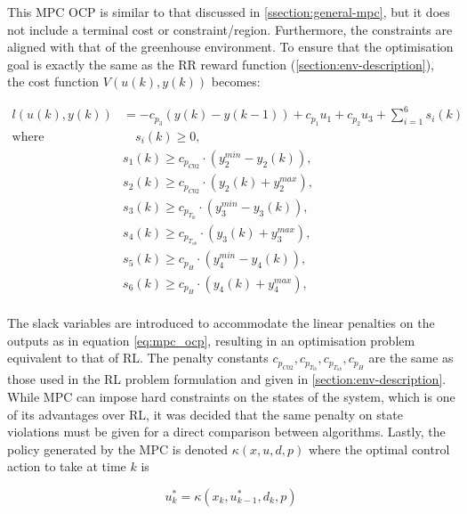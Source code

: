 This MPC OCP is similar to that discussed in \autoref{ssection:general-mpc}, but it does not include a terminal cost or constraint/region. Furthermore, the constraints are aligned with that of the greenhouse environment. To ensure that the optimisation goal is exactly the same as the RR reward function (\autoref{section:env-description}), the cost function $V(u(k),y(k))$ becomes:

\begin{equation} \label{eq:mpc_stage_cost}
	\begin{aligned}
		l(u(k),y(k)) & = - c_{p_3} (y(k) - y(k-1)) + c_{p_1} u_{1} + c_{p_2} u_{3} + \sum_{i = 1}^6 s_i(k) \\
		\text{where} & \quad s_i(k) \geq 0, \\
		& s_1(k) \geq c_{p_{C02}} \cdot (y_2^{min} - y_2(k)), \\ 
		& s_2(k) \geq c_{p_{C02}} \cdot (y_2(k) + y_2^{max}), \\ 
		& s_3(k) \geq c_{p_{T_{lb}}} \cdot (y_3^{min} - y_3(k)), \\ 
		& s_4(k) \geq c_{p_{T_{ub}}} \cdot (y_3(k) + y_3^{max}), \\ 
		& s_5(k) \geq c_{p_{H}} \cdot (y_4^{min} - y_4(k)), \\ 
		& s_6(k) \geq c_{p_{H}} \cdot (y_4(k) + y_4^{max}), \\
	\end{aligned}	
\end{equation}

The slack variables are introduced to accommodate the linear penalties on the outputs as in equation \autoref{eq:mpc_ocp}, resulting in an optimisation problem equivalent to that of RL. The penalty constants $c_{p_{C02}},c_{p_{T_{lb}}},c_{p_{T_{ub}}},c_{p_{H}}$ are the same as those used in the RL problem formulation and given in \autoref{section:env-description}. While MPC can impose hard constraints on the states of the system, which is one of its advantages over RL, it was decided that the same penalty on state violations must be given for a direct comparison between algorithms. Lastly, the policy generated by the MPC is denoted $\kappa(x,u,d,p)$ where the optimal control action to take at time $k$ is

\begin{equation}\label{eq:mpc_policy_notation}
	u_k^* = \kappa(x_k,u_{k-1}^*, d_k, p)
\end{equation}

